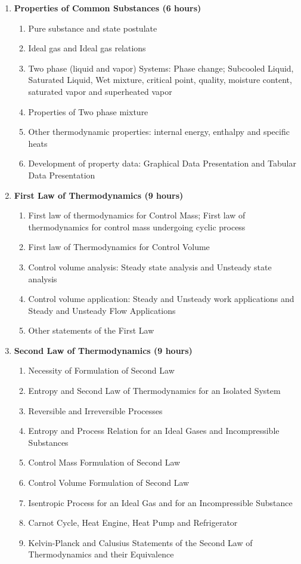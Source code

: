 \begin{enumerate}
    \item \textbf{Properties of Common Substances \hfill (6 hours)}
    \begin{enumerate}
        \item Pure substance and state postulate
        \item Ideal gas and Ideal gas relations
        \item Two phase (liquid and vapor) Systems: Phase change; Subcooled Liquid, Saturated Liquid, Wet mixture, critical point, quality, moisture content, saturated vapor and superheated vapor
        \item Properties of Two phase mixture
        \item Other thermodynamic properties: internal energy, enthalpy and specific heats
        \item Development of property data: Graphical Data Presentation and Tabular Data Presentation
    \end{enumerate}
    
    \item \textbf{First Law of Thermodynamics \hfill (9 hours)}
    \begin{enumerate}
        \item First law of thermodynamics for Control Mass; First law of thermodynamics for control mass undergoing cyclic process
        \item First law of Thermodynamics for Control Volume
        \item Control volume analysis: Steady state analysis and Unsteady state analysis
        \item Control volume application: Steady and Unsteady work applications and Steady and Unsteady Flow Applications
        \item Other statements of the First Law
    \end{enumerate}
    
    \item \textbf{Second Law of Thermodynamics \hfill (9 hours)}
    \begin{enumerate}
        \item Necessity of Formulation of Second Law
        \item Entropy and Second Law of Thermodynamics for an Isolated System
        \item Reversible and Irreversible Processes
        \item Entropy and Process Relation for an Ideal Gases and Incompressible Substances
        \item Control Mass Formulation of Second Law
        \item Control Volume Formulation of Second Law
        \item Isentropic Process for an Ideal Gas and for an Incompressible Substance
        \item Carnot Cycle, Heat Engine, Heat Pump and Refrigerator
        \item Kelvin-Planck and Calusius Statements of the Second Law of Thermodynamics and their Equivalence
    \end{enumerate}
    

\end{enumerate}

